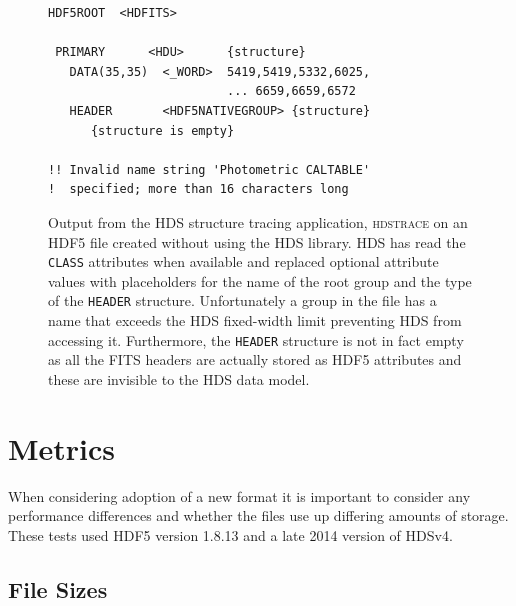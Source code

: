\documentclass[final,authoryear,5p,times,twocolumn]{elsarticle}
\begin{document}
\begin{figure}
\small
\begin{verbatim}
HDF5ROOT  <HDFITS>

 PRIMARY      <HDU>      {structure}
   DATA(35,35)  <_WORD>  5419,5419,5332,6025,
                         ... 6659,6659,6572
   HEADER       <HDF5NATIVEGROUP> {structure}
      {structure is empty}

!! Invalid name string 'Photometric CALTABLE'
!  specified; more than 16 characters long
\end{verbatim}
\caption{Output from the HDS structure tracing application,
  \textsc{hdstrace} on an HDF5 file created without using the HDS
  library. HDS has read the \texttt{CLASS} attributes when available
  and replaced optional attribute values with placeholders for the
  name of the root group and the type of the \texttt{HEADER}
  structure. Unfortunately a group in the file has a name that exceeds
  the HDS fixed-width limit preventing HDS from accessing it. Furthermore,
  the \texttt{HEADER} structure is not in fact empty as all the FITS headers
  are actually stored as HDF5 attributes and these are invisible to the HDS
  data model.}
\label{fig:h5traces}
\end{figure}

\section{Metrics}

When considering adoption of a new format it is important to
consider any performance differences and whether the files use up
differing amounts of storage. These tests used HDF5 version 1.8.13 and
a late 2014 version of HDSv4.

\subsection{File Sizes}
\end{document}
